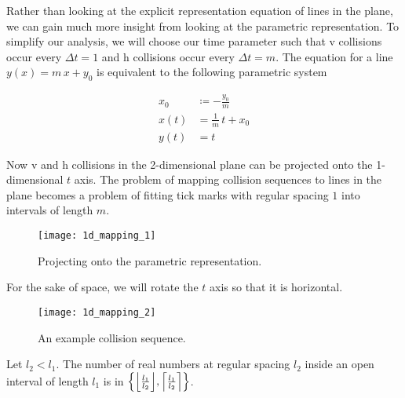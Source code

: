 
Rather than looking at the explicit representation equation of lines in the plane, we can gain much more insight from looking at the parametric representation. To simplify our analysis, we will choose our time parameter such that v collisions occur every $\Delta t = 1$ and h collisions occur every $\Delta t = m$. The equation for a line $y(x) = m \, x + y_0$ is equivalent to the following parametric system

\begin{align}\label{eq:parametric-line}
	x_0& \coloneqq - \frac{y_0}{m}\\
	x(t)& = \frac{1}{m} \, t + x_0\\
	y(t)& = t
\end{align}

Now v and h collisions in the 2-dimensional plane can be projected onto the 1-dimensional $t$ axis. The problem of mapping collision sequences to lines in the plane becomes a problem of fitting tick marks with regular spacing $1$ into intervals of length $m$.

\begin{figure}[H]
  \begin{center}
    \texttt{[image: 1d\_mapping\_1]}
  \end{center}
  \vspace{-.2in} %
  \caption{\label{fig:1d-projection} Projecting onto the parametric representation.}
\end{figure}

For the sake of space, we will rotate the $t$ axis so that it is horizontal.

\begin{figure}[H]
  \begin{center}
    \texttt{[image: 1d\_mapping\_2]}
  \end{center}
  \vspace{-.2in} %
  \caption{\label{fig:1d-problem} An example collision sequence.}
\end{figure}


\begin{lemma}\label{lem:interval-ticks}
	Let $l_2 < l_1$. The number of real numbers at regular spacing $l_2$ inside an open interval of length $l_1$ is in $\cbracket{\floor{\frac{l_1}{l_2}}, \ceil{\frac{l_1}{l_2}}}$.
\end{lemma}

